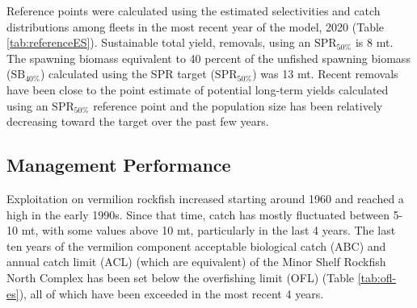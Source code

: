 \documentclass[11pt,
  english,
  a4paper,
]{article}
\begin{document}
\tagmcend\tagstructend


Reference points were calculated using the estimated selectivities and catch distributions among fleets in the most recent year of the model, 2020 (Table \ref{tab:referenceES}). Sustainable total yield, removals, using an {\(\text{SPR}_{50\%}\)\leavevmode\tagmcend\tagstructend} is 8 mt. The spawning biomass equivalent to 40 percent of the unfished spawning biomass ({\(\text{SB}_{40\%}\)\leavevmode\tagmcend\tagstructend}) calculated using the SPR target ({\(\text{SPR}_{50\%}\)\leavevmode\tagmcend\tagstructend}) was 13 mt. Recent removals have been close to the point estimate of potential long-term yields calculated using an {\(\text{SPR}_{50\%}\)\leavevmode\tagmcend\tagstructend} reference point and the population size has been relatively decreasing toward the target over the past few years.

\leavevmode\tagmcend\tagstructend\par



\clearpage


\hypertarget{management-performance}{%
\subsection*{Management Performance}\label{management-performance}}

\leavevmode\tagmcend\tagstructend


Exploitation on vermilion rockfish increased starting around 1960 and reached a high in the early 1990s. Since that time, catch has mostly fluctuated between 5-10 mt, with some values above 10 mt, particularly in the last 4 years. The last ten years of the vermilion component acceptable biological catch (ABC) and annual catch limit (ACL) (which are equivalent) of the Minor Shelf Rockfish North Complex has been set below the overfishing limit (OFL) (Table \ref{tab:ofl-es}), all of which have been exceeded in the most recent 4 years.
\end{document}
